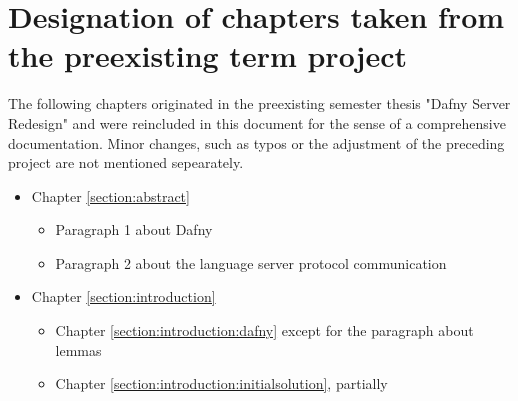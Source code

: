\section{Designation of chapters taken from the preexisting term project}
The following chapters originated in the preexisting semester thesis "Dafny Server Redesign"\cite{sa} and were reincluded in this document for the sense of a comprehensive documentation. Minor changes, such as typos or the adjustment of the preceding project are not mentioned sepearately.
\begin{itemize}
    \item Chapter \ref{section:abstract}
        \begin{itemize}
            \item Paragraph 1 about Dafny
            \item Paragraph 2 about the language server protocol communication
        \end{itemize}
    \item Chapter \ref{section:introduction}
        \begin{itemize}
            \item Chapter \ref{section:introduction:dafny} except for the paragraph about lemmas
            \item Chapter \ref{section:introduction:initialsolution}, partially
        \end{itemize}

\end{itemize}